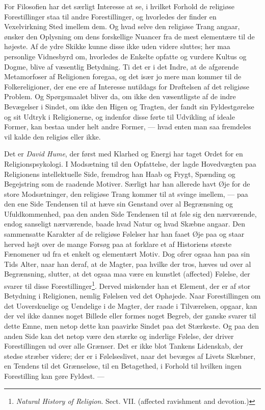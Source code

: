 \documentclass[12pt,a4paper]{book}
\newcommand{\opage}[1]{\marginnote{\footnotesize\textit{[#1]}}}
\begin{document}
For Filosofien har det særligt Interesse at se, i hvilket Forhold de religiøse Forestillinger
staa til andre Forestillinger, og hvorledes der finder en Vexelvirkning Sted imellem dem. Og
hvad selve den religiøse Trang angaar, ønsker den Oplysning om dens forskellige Nuancer fra
de mest elementære til de højeste. Af de ydre Skikke kunne disse ikke uden videre sluttes; her
maa personlige Vidnesbyrd om, hvorledes de Enkelte opfatte og vurdere Kultus og Dogme, blive
af væsentlig Betydning. Ti det er i det Indre, at de afgørende Metamorfoser af Religionen
foregaa, og det især jo mere man kommer til de Folkereligioner, der ene ere af Interesse
nutildags for Drøftelsen af det religiøse Problem. Og Spørgsmaalet bliver da, om ikke den
væsentligste af de indre Bevægelser i Sindet, om ikke den Higen og Tragten, der fandt sin
Fyldestgørelse og sit Udtryk i \opage{373} Religionerne, og indenfor disse førte til Udvikling af ideale
Former, kan bestaa under helt andre Former, --- hvad enten man saa fremdeles vil kalde den
religiøs eller ikke.

Det er \emph{David Hume}, der først med Klarhed og Energi har taget Ordet for en
Religionspsykologi. I Modsætning til den Opfattelse, der lagde Hovedvægten paa Religionens
intellektuelle Side, fremdrog han Haab og Frygt, Spænding og Begejstring som de raadende
Motiver. Særligt har han allerede havt Øje for de store Modsætninger, den religiøse Trang kommer til at svinge imellem, --- paa den ene Side Tendensen til at hæve sin
Genstand over al Begrænsning og Ufuldkommenhed, paa den anden Side Tendensen til at føle sig
den nærværende, endog sanseligt nærværende, baade hvad Natur og hvad Skæbne angaar. Den
sammensatte Karakter af de religiøse Følelser har han faaet Øje paa og staar herved højt over
de mange Forsøg paa at forklare et af Historiens største Fænomener ud fra et enkelt og
elementært Motiv. Dog ofrer ogsaa han paa sin Tids Alter, naar han deraf, at de Magter, paa
hvilke der tros, hæves ud over al Begrænsning, slutter, at det ogsaa maa være en kunstlet
(affected) Følelse, der svarer til disse Forestillinger\footnote{\emph{Natural History of
Religion}. Sect. VII. (affected ravishment and devotion.)}. Derved miskender han et Element,
der er af stor Betydning i Religionen, nemlig Følelsen ved det Ophøjede. Naar Forestillingen
om det Uoverskuelige og Uendelige i de Magter, der raade i Tilværelsen, opgaar, kan der vel
ikke dannes noget Billede eller formes noget Begreb, der ganske svarer til dette Emne, men
netop dette kan paavirke Sindet paa det Stærkeste. Og paa den anden Side kan det netop være
den stærke og inderlige Følelse, der driver Forestillingen ud over alle Grænser. Det er ikke
blot Tankens Lidenskab, der stedse stræber videre; der er i Følelseslivet, naar det bevæges
af Livets Skæbner, en Tendens til det Grænseløse, til en Betagethed, i Forhold til hvilken
ingen Forestilling kan gøre Fyldest. ---
\end{document}
